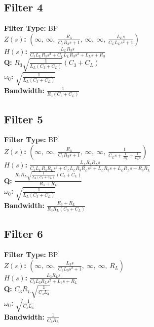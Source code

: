 \documentclass{article}
\begin{document}
\subsection*{Filter 4}
\textbf{Filter Type:} BP \\ 
\textbf{$Z(s)$:} $\left( \infty, \  \infty, \  \frac{R_{3}}{C_{3} R_{3} s + 1}, \  \infty, \  \infty, \  \frac{L_{L} s}{C_{L} L_{L} s^{2} + 1}\right)$ \\ 
\textbf{$H(s)$:} $\frac{L_{L} R_{3} s}{C_{3} L_{L} R_{3} s^{2} + C_{L} L_{L} R_{3} s^{2} + L_{L} s + R_{3}}$ \\ 
\textbf{Q:} $R_{3} \sqrt{\frac{1}{L_{L} \left(C_{3} + C_{L}\right)}} \left(C_{3} + C_{L}\right)$ \\ 
\textbf{$\omega_0$:} $\sqrt{\frac{1}{L_{L} \left(C_{3} + C_{L}\right)}}$ \\ 
\textbf{Bandwidth:} $\frac{1}{R_{3} \left(C_{3} + C_{L}\right)}$ \\ 
\subsection*{Filter 5}
\textbf{Filter Type:} BP \\ 
\textbf{$Z(s)$:} $\left( \infty, \  \infty, \  \frac{R_{3}}{C_{3} R_{3} s + 1}, \  \infty, \  \infty, \  \frac{1}{C_{L} s + \frac{1}{R_{L}} + \frac{1}{L_{L} s}}\right)$ \\ 
\textbf{$H(s)$:} $\frac{L_{L} R_{3} R_{L} s}{C_{3} L_{L} R_{3} R_{L} s^{2} + C_{L} L_{L} R_{3} R_{L} s^{2} + L_{L} R_{3} s + L_{L} R_{L} s + R_{3} R_{L}}$ \\ 
\textbf{Q:} $\frac{R_{3} R_{L} \sqrt{\frac{1}{L_{L} \left(C_{3} + C_{L}\right)}} \left(C_{3} + C_{L}\right)}{R_{3} + R_{L}}$ \\ 
\textbf{$\omega_0$:} $\sqrt{\frac{1}{L_{L} \left(C_{3} + C_{L}\right)}}$ \\ 
\textbf{Bandwidth:} $\frac{R_{3} + R_{L}}{R_{3} R_{L} \left(C_{3} + C_{L}\right)}$ \\ 
\subsection*{Filter 6}
\textbf{Filter Type:} BP \\ 
\textbf{$Z(s)$:} $\left( \infty, \  \infty, \  \frac{L_{3} s}{C_{3} L_{3} s^{2} + 1}, \  \infty, \  \infty, \  R_{L}\right)$ \\ 
\textbf{$H(s)$:} $\frac{L_{3} R_{L} s}{C_{3} L_{3} R_{L} s^{2} + L_{3} s + R_{L}}$ \\ 
\textbf{Q:} $C_{3} R_{L} \sqrt{\frac{1}{C_{3} L_{3}}}$ \\ 
\textbf{$\omega_0$:} $\sqrt{\frac{1}{C_{3} L_{3}}}$ \\ 
\textbf{Bandwidth:} $\frac{1}{C_{3} R_{L}}$ \\ 
\end{document}
